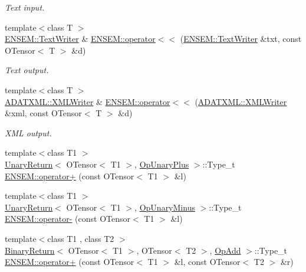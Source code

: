 \begin{DoxyCompactItemize}
\begin{DoxyCompactList}\small\item\em Text input. \end{DoxyCompactList}\item 
{\footnotesize template$<$class T $>$ }\\\mbox{\hyperlink{classENSEM_1_1TextWriter}{E\+N\+S\+E\+M\+::\+Text\+Writer}} \& \mbox{\hyperlink{group__obstensor_ga64bc4e87abaefe7d97e074a4cb88e035}{E\+N\+S\+E\+M\+::operator$<$$<$}} (\mbox{\hyperlink{classENSEM_1_1TextWriter}{E\+N\+S\+E\+M\+::\+Text\+Writer}} \&txt, const O\+Tensor$<$ T $>$ \&d)
\begin{DoxyCompactList}\small\item\em Text output. \end{DoxyCompactList}\item 
{\footnotesize template$<$class T $>$ }\\\mbox{\hyperlink{classADATXML_1_1XMLWriter}{A\+D\+A\+T\+X\+M\+L\+::\+X\+M\+L\+Writer}} \& \mbox{\hyperlink{group__obstensor_gaa5233df95541acbbe7762e49152aaeb5}{E\+N\+S\+E\+M\+::operator$<$$<$}} (\mbox{\hyperlink{classADATXML_1_1XMLWriter}{A\+D\+A\+T\+X\+M\+L\+::\+X\+M\+L\+Writer}} \&xml, const O\+Tensor$<$ T $>$ \&d)
\begin{DoxyCompactList}\small\item\em X\+ML output. \end{DoxyCompactList}\item 
{\footnotesize template$<$class T1 $>$ }\\\mbox{\hyperlink{structUnaryReturn}{Unary\+Return}}$<$ O\+Tensor$<$ T1 $>$, \mbox{\hyperlink{structOpUnaryPlus}{Op\+Unary\+Plus}} $>$\+::Type\+\_\+t \mbox{\hyperlink{group__obstensor_ga1b7029ac61e62bdd191703e814e622b3}{E\+N\+S\+E\+M\+::operator+}} (const O\+Tensor$<$ T1 $>$ \&l)
\item 
{\footnotesize template$<$class T1 $>$ }\\\mbox{\hyperlink{structUnaryReturn}{Unary\+Return}}$<$ O\+Tensor$<$ T1 $>$, \mbox{\hyperlink{structOpUnaryMinus}{Op\+Unary\+Minus}} $>$\+::Type\+\_\+t \mbox{\hyperlink{group__obstensor_gab017a217eb9e1e85386eb640bca457ab}{E\+N\+S\+E\+M\+::operator-\/}} (const O\+Tensor$<$ T1 $>$ \&l)
\item 
{\footnotesize template$<$class T1 , class T2 $>$ }\\\mbox{\hyperlink{structBinaryReturn}{Binary\+Return}}$<$ O\+Tensor$<$ T1 $>$, O\+Tensor$<$ T2 $>$, \mbox{\hyperlink{structOpAdd}{Op\+Add}} $>$\+::Type\+\_\+t \mbox{\hyperlink{group__obstensor_gad61499ec3fe572c419aa5143ef37d965}{E\+N\+S\+E\+M\+::operator+}} (const O\+Tensor$<$ T1 $>$ \&l, const O\+Tensor$<$ T2 $>$ \&r)

\end{DoxyCompactItemize}

